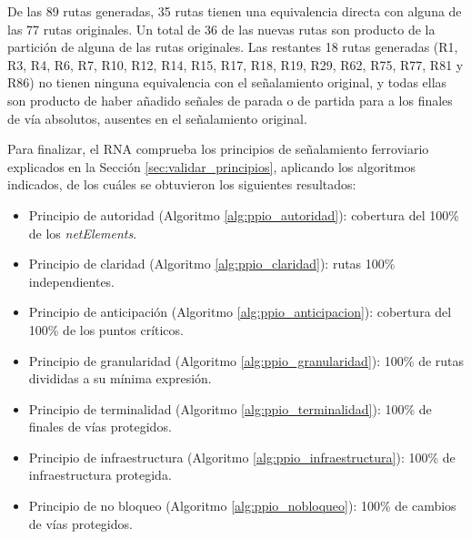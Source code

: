     De las 89 rutas generadas, 35 rutas tienen una equivalencia directa con alguna de las 77 rutas originales. Un total de 36 de las nuevas rutas son producto de la partición de alguna de las rutas originales. Las restantes 18 rutas generadas (R1, R3, R4, R6, R7, R10, R12, R14, R15, R17, R18, R19, R29, R62, R75, R77, R81 y R86) no tienen ninguna equivalencia con el señalamiento original, y todas ellas son producto de haber añadido señales de parada o de partida para a los finales de vía absolutos, ausentes en el señalamiento original.
    
    Para finalizar, el RNA comprueba los principios de señalamiento ferroviario explicados en la Sección \ref{sec:validar_principios}, aplicando los algoritmos indicados, de los cuáles se obtuvieron los siguientes resultados:
    
    \begin{itemize}
    	\item Principio de autoridad (Algoritmo \ref{alg:ppio_autoridad}): cobertura del 100\% de los \textit{netElements}.
    	\item Principio de claridad (Algoritmo \ref{alg:ppio_claridad}): rutas 100\% independientes.
    	\item Principio de anticipación (Algoritmo \ref{alg:ppio_anticipacion}): cobertura del 100\% de los puntos críticos.
    	\item Principio de granularidad (Algoritmo \ref{alg:ppio_granularidad}): 100\% de rutas divididas a su mínima expresión.
    	\item Principio de terminalidad (Algoritmo \ref{alg:ppio_terminalidad}): 100\% de finales de vías protegidos.
    	\item Principio de infraestructura (Algoritmo \ref{alg:ppio_infraestructura}): 100\% de infraestructura protegida.
    	\item Principio de no bloqueo (Algoritmo \ref{alg:ppio_nobloqueo}): 100\% de cambios de vías protegidos.
    \end{itemize}	
    